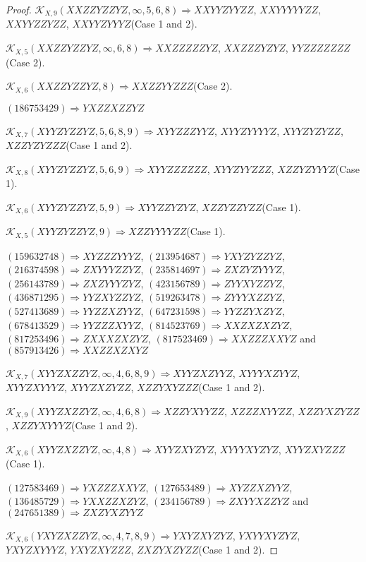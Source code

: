 \documentclass[12pt]{article}
\theoremstyle{plain}
\theoremstyle{definition}
\theoremstyle{remark}
\newcommand{\fancy}[1]{\mathcal{#1}}
\def\K{\fancy{K}}
\begin{document}
\begin{proof}
	$\K_{X,9}(XXZZYZZYZ,\infty,5, 6, 8)\Rightarrow $$XXYYZYYZZ$, $XXYYYYYZZ$, $XXYYZZYZZ$, $XXYYZYYYZ$(Case 1 and 2).
	
	$\K_{X,5}(XXZZYZZYZ,\infty,6, 8)\Rightarrow $$XXZZZZZYZ$, $XXZZZYZYZ$, $YYZZZZZZZ$(Case 2).
	
	$\K_{X,6}(XXZZYZZYZ,8)\Rightarrow $$XXZZYYZZZ$(Case 2).
	
	
	
	$(1 8 6 7 5 3 4 2 9)\Rightarrow YXZZXZZYZ$
	
	
	$\K_{X,7}(XYYZYZZYZ,5, 6, 8, 9)\Rightarrow $$XYYZZZYYZ$, $XYYZYYYYZ$, $XYYZYZYZZ$, $XZZYZYZZZ$(Case 1 and 2).
	
	$\K_{X,8}(XYYZYZZYZ,5, 6, 9)\Rightarrow $$XYYZZZZZZ$, $XYYZYYZZZ$, $XZZYZYYYZ$(Case 1).
	
	$\K_{X,6}(XYYZYZZYZ,5, 9)\Rightarrow $$XYYZZYZYZ$, $XZZYZZYZZ$(Case 1).
	
	$\K_{X,5}(XYYZYZZYZ,9)\Rightarrow $$XZZYYYYZZ$(Case 1).
	
	
	
	$(1 5 9 6 3 2 7 4 8)\Rightarrow XYZZZYYYZ$, $(2 1 3 9 5 4 6 8 7)\Rightarrow YXYZYZZYZ$, $(2 1 6 3 7 4 5 9 8)\Rightarrow ZXYYYZZYZ$, $(2 3 5 8 1 4 6 9 7)\Rightarrow ZXZYZYYYZ$, $(2 5 6 1 4 3 7 8 9)\Rightarrow ZXZYYYZYZ$, $(4 2 3 1 5 6 7 8 9)\Rightarrow ZYYXYZZYZ$, $(4 3 6 8 7 1 2 9 5)\Rightarrow YYZXYZZYZ$, $(5 1 9 2 6 3 4 7 8)\Rightarrow ZYYYXZZYZ$, $(5 2 7 4 1 3 6 8 9)\Rightarrow YYZZXZYYZ$, $(6 4 7 2 3 1 5 9 8)\Rightarrow YYZZYXZYZ$, $(6 7 8 4 1 3 5 2 9)\Rightarrow YYZZZXYYZ$, $(8 1 4 5 2 3 7 6 9)\Rightarrow XXZXZXZYZ$, $(8 1 7 2 5 3 4 9 6)\Rightarrow ZXXXZXZYZ$, $(8 1 7 5 2 3 4 6 9)\Rightarrow XXZZZXXYZ$ and $(8 5 7 9 1 3 4 2 6)\Rightarrow XXZZXZXYZ$
	
	
	$\K_{X,7}(XYYZXZZYZ,\infty,4, 6, 8, 9)\Rightarrow $$XYYZXZYYZ$, $XYYYXZYYZ$, $XYYZXYYYZ$, $XYYZXZYZZ$, $XZZYXYZZZ$(Case 1 and 2).
	
	$\K_{X,9}(XYYZXZZYZ,\infty,4, 6, 8)\Rightarrow $$XZZYXYYZZ$, $XZZZXYYZZ$, $XZZYXZYZZ$, $XZZYXYYYZ$(Case 1 and 2).
	
	$\K_{X,6}(XYYZXZZYZ,\infty,4, 8)\Rightarrow $$XYYZXYZYZ$, $XYYYXYZYZ$, $XYYZXYZZZ$(Case 1).
	
	
	
	$(1 2 7 5 8 3 4 6 9)\Rightarrow YXZZZXXYZ$, $(1 2 7 6 5 3 4 8 9)\Rightarrow XYZZXZYYZ$, $(1 3 6 4 8 5 7 2 9)\Rightarrow YXXZZXZYZ$, $(2 3 4 1 5 6 7 8 9)\Rightarrow ZXYYXZZYZ$ and $(2 4 7 6 5 1 3 8 9)\Rightarrow ZXZYXZYYZ$
	
	
	$\K_{X,6}(YXYZXZZYZ,\infty,4, 7, 8, 9)\Rightarrow $$YXYZXYZYZ$, $YXYYXYZYZ$, $YXYZXYYYZ$, $YXYZXYZZZ$, $ZXZYXZYZZ$(Case 1 and 2).
	

\end{proof}
\end{document}
